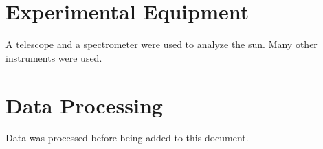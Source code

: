 

\begin{theappendices}

\chapter{Experimental Equipment}
A telescope and a spectrometer were used to analyze the sun. Many other instruments were used.

\chapter{Data Processing}
Data was processed before being added to this document.

\end{theappendices}